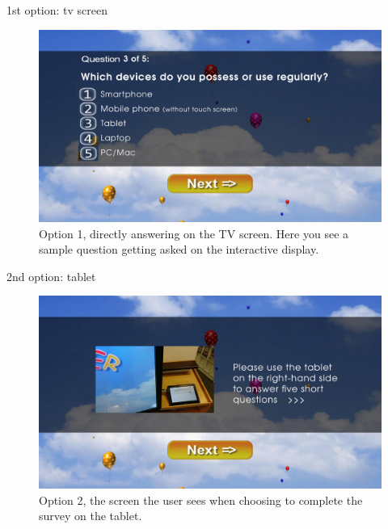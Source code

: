     1st option: tv screen

    \begin{figure}
        \begin{center}
            \includegraphics[width=\columnwidth]{img/screenshots/option-tv.jpg}
        \end{center}
     \caption{Option 1, directly answering on the TV screen. Here you see a sample question getting asked on the interactive display.}
     \label{screenshot:tv-option}
    \end{figure}


    2nd option: tablet

    \begin{figure}
        \begin{center}
            \includegraphics[width=\columnwidth]{img/screenshots/option-tablet.jpg}
        \end{center}
     \caption{Option 2, the screen the user sees when choosing to complete the survey on the tablet.}
     \label{screenshot:tablet-option}
    \end{figure}


